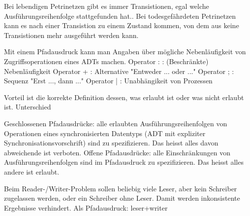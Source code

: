 \begin{answer}
Bei lebendigen Petrinetzen gibt es immer Transistionen, egal welche Ausführungsreihenfolge stattgefunden
hat..
Bei todesgefährdeten Petrinetzen kann es nach einer Transistion zu einem Zustand kommen, von
dem aus keine Transistionen mehr ausgeführt werden kann.
\end{answer}

\begin{answer}
Mit einem Pfadausdruck kann man Angaben über mögliche Nebenläufigkeit von Zugriffsoperationen
eines ADTs machen.
Operator : : (Beschränkte) Nebenläufigkeit
Operator + : Alternative "Entweder ... oder ..."
Operator ; : Sequenz "Erst ..., dann ..."
Operator | : Unabhängikeit von Prozessen
\end{answer}

\begin{answer}
Vorteil ist die korrekte Definition dessen, was erlaubt ist oder was nicht erlaubt ist. Unterschied
\end{answer}

\begin{answer}
Geschlossenen Pfadausdrücke: alle erlaubten Ausführungsreihenfolgen von Operationen eines synchronisierten
Datentyps (ADT mit expliziter Synchronisationsvorschrift) sind zu spezifizieren. Das
heisst alles davon abweichende ist verboten.
Offene Pfadausdrücke: alle Einschränkungen von Ausführungsreihenfolgen sind im Pfadausdruck
zu spezifizieren. Das heisst alles andere ist erlaubt.
\end{answer}

\begin{answer}
Beim Reader-/Writer-Problem sollen beliebig viele Leser, aber kein Schreiber zugelassen werden,
oder ein Schreiber ohne Leser. Damit werden inkonsistente Ergebnisse verhindert.
Als Pfadausdruck: leser+writer
\end{answer}

